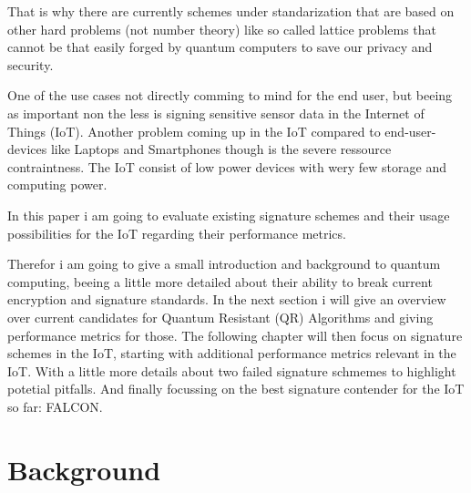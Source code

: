 \documentclass[conference]{IEEEtran}
\begin{document}
That is why there are currently schemes under standarization\cite{PQClean-GH} that are based on other hard problems (not number theory) like so called lattice problems that cannot be that easily forged by quantum computers to save our privacy and security.

One of the use cases not directly comming to mind for the end user, but beeing as important non the less is signing sensitive sensor data in the Internet of Things (IoT).
Another problem coming up in the IoT compared to end-user-devices like Laptops and Smartphones though is the severe ressource contraintness. 
The IoT consist of low power devices with wery few storage and computing power.

In this paper i am going to evaluate existing signature schemes and their usage possibilities for the IoT regarding their performance metrics.

Therefor i am going to give a small introduction and background to quantum computing, beeing a little more detailed about their ability to break current encryption and signature standards.
In the next section i will give an overview over current candidates for Quantum Resistant (QR) Algorithms and giving performance metrics for those.
The following chapter will then focus on signature schemes in the IoT, starting with additional performance metrics relevant in the IoT.
With a little more details about two failed signature schmemes to highlight potetial pitfalls. 
And finally focussing on the best signature contender for the IoT so far: FALCON.

\section{Background}
\end{document}
